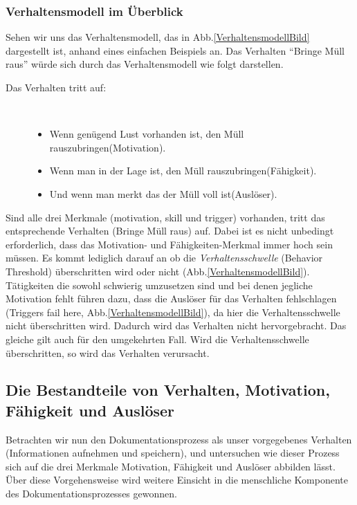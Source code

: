 \documentclass[a4paper,12pt,twoside]{scrartcl}
\begin{document}
\subsubsection{Verhaltensmodell im Überblick}
Sehen wir uns das Verhaltensmodell, das in Abb.\ref{VerhaltensmodellBild} dargestellt ist, anhand eines einfachen Beispiels an. Das Verhalten \enquote{Bringe Müll raus} würde sich durch das Verhaltensmodell wie folgt darstellen. 
\begin{description}
   \item[Das Verhalten tritt auf:]~\par
   \begin{itemize}
      \item Wenn genügend Lust vorhanden ist, den Müll rauszubringen(Motivation).
      \item Wenn man in der Lage ist, den Müll rauszubringen(Fähigkeit).
      \item Und wenn man merkt das der Müll voll ist(Auslöser).
   \end{itemize}
\end{description}  
Sind alle drei Merkmale (motivation, skill und trigger) vorhanden, tritt das entsprechende Verhalten (Bringe Müll raus) auf. Dabei ist es nicht unbedingt erforderlich, dass das Motivation- und Fähigkeiten-Merkmal immer hoch sein müssen. Es kommt lediglich darauf an ob die \textit{Verhaltensschwelle} (Behavior Threshold) überschritten wird oder nicht (Abb.\ref{VerhaltensmodellBild}). Tätigkeiten die sowohl schwierig umzusetzen sind und bei denen jegliche Motivation fehlt führen dazu, dass die Auslöser für das Verhalten fehlschlagen (Triggers fail here, Abb.\ref{VerhaltensmodellBild}), da hier die Verhaltensschwelle nicht überschritten wird. Dadurch wird das Verhalten nicht hervorgebracht. Das gleiche gilt auch für den umgekehrten Fall. Wird die Verhaltensschwelle überschritten, so wird das Verhalten verursacht. 

\subsection{Die Bestandteile von Verhalten, Motivation, Fähigkeit und Auslöser}
Betrachten wir nun den Dokumentationsprozess als unser vorgegebenes Verhalten (Informationen aufnehmen und speichern), und untersuchen wie dieser Prozess sich auf die drei Merkmale Motivation, Fähigkeit und Auslöser abbilden lässt. Über diese Vorgehensweise wird weitere Einsicht in die menschliche Komponente des Dokumentationsprozesses gewonnen.
\end{document}
